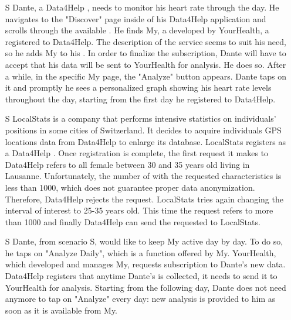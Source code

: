 \documentclass[../../rasd.tex]{subfiles}
\begin{document}
\begin{itemize}
                    \item[S\subs{3}] Dante, a Data4Help , needs to monitor his heart rate through the day. He navigates to the "Discover" page inside of his Data4Help application and scrolls through the available . He finds My, a  developed by YourHealth, a  registered to Data4Help. The description of the service seems to suit his need, so he adds My to his . In order to finalize the subscription, Dante will have to accept that his data will be sent to YourHealth for analysis. He does so. After a while, in the specific My  page, the "Analyze" button appears. Dante taps on it and promptly he sees a personalized graph showing his heart rate levels throughout the day, starting from the first day he registered to Data4Help.

                    \item[S\subs{4}] LocalStats is a company that performs intensive statistics on individuals' positions in some cities of Switzerland. It decides to acquire individuals GPS locations data from Data4Help to enlarge its database. LocalStats registers as a Data4Help . Once registration is complete, the first request it makes to Data4Help refers to all female  between 30 and 35 years old living in Lausanne. Unfortunately, the number of  with the requested characteristics is less than 1000, which does not guarantee proper data anonymization. Therefore, Data4Help rejects the  request. LocalStats tries again changing the interval of interest to 25-35 years old. This time the request refers to more than 1000  and finally Data4Help can send the requested  to LocalStats.

                    \item[S\subs{5}] Dante, from scenario S, would like to keep My active day by day. To do so, he taps on "Analyze Daily", which is a function offered by My. YourHealth, which developed and manages My, requests subscription to Dante's new data. Data4Help registers that anytime Dante's  is collected, it needs to send it to YourHealth for analysis. Starting from the following day, Dante does not need anymore to tap on "Analyze" every day: new analysis is provided to him as soon as it is available from My.


\end{itemize}
\end{document}
